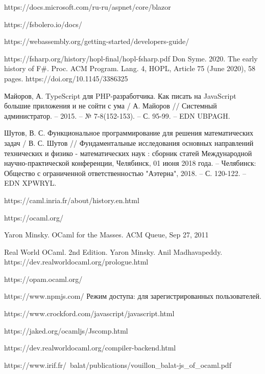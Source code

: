 \begin{thebibliography}{00}
    https://docs.microsoft.com/ru-ru/aspnet/core/blazor \TODO

    https://fsbolero.io/docs/ \TODO

    https://webassembly.org/getting-started/developers-guide/ \TODO

    https://fsharp.org/history/hopl-final/hopl-fsharp.pdf
    Don Syme. 2020. The early history of F\#. Proc. ACM Program. Lang. 4, HOPL, Article 75 (June 2020), 58 pages. https://doi.org/10.1145/3386325
    \TODO

    Майоров, А. TypeScript для PHP-разработчика. Как писать на JavaScript большие приложения и не сойти с ума /
    А. Майоров // Системный администратор. – 2015. – № 7-8(152-153). – С. 95-99. – EDN UBPAGH.

    Шутов, В. С. Функциональное программирование для решения математических задач
    / В. С. Шутов // Фундаментальные исследования основных направлений технических и физико - математических наук
    : сборник статей Международной научно-практической конференции, Челябинск, 01 июня 2018 года.
    – Челябинск: Общество с ограниченной ответственностью "Аэтерна", 2018. – С. 120-122. – EDN XPWRYL.

    https://caml.inria.fr/about/history.en.html \TODO

    https://ocaml.org/ \TODO

    Yaron Minsky. OCaml for the Masses. ACM Queue, Sep 27, 2011 \TODO

    Real World OCaml. 2nd Edition. Yaron Minsky. Anil Madhavapeddy.
    https://dev.realworldocaml.org/prologue.html \TODO

    https://opam.ocaml.org/ \TODO

    https://www.npmjs.com/ \TODO Режим доступа: для зарегистрированных пользователей.

    https://www.crockford.com/javascript/javascript.html \TODO

    https://jaked.org/ocamljs/Jscomp.html \TODO

    https://dev.realworldocaml.org/compiler-backend.html \TODO

    https://www.irif.fr/~balat/publications/vouillon\_balat-js\_of\_ocaml.pdf \TODO


\end{thebibliography}
